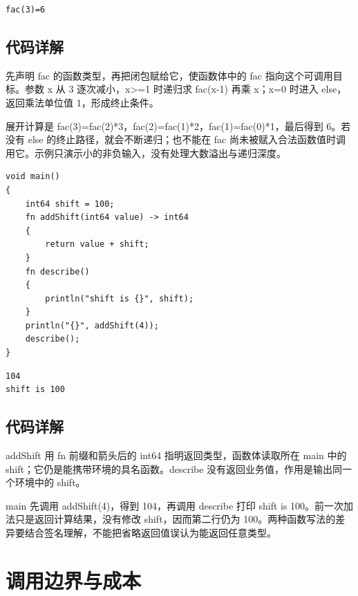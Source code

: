 \par
\medskip
\begin{lstlisting}[style=out]
fac(3)=6
\end{lstlisting}
\par
\medskip

\subsection*{代码详解}

先声明 fac 的函数类型，再把闭包赋给它，使函数体中的 fac 指向这个可调用目标。参数 x 从 3 逐次减小，x>=1 时递归求 fac(x-1) 再乘 x；x=0 时进入 else，返回乘法单位值 1，形成终止条件。

展开计算是 fac(3)=fac(2)*3，fac(2)=fac(1)*2，fac(1)=fac(0)*1，最后得到 6。若没有 else 的终止路径，就会不断递归；也不能在 fac 尚未被赋入合法函数值时调用它。示例只演示小的非负输入，没有处理大数溢出与递归深度。

\par
\medskip
\begin{lstlisting}[style=chali]
void main()
{
    int64 shift = 100;
    fn addShift(int64 value) -> int64
    {
        return value + shift;
    }
    fn describe()
    {
        println("shift is {}", shift);
    }
    println("{}", addShift(4));
    describe();
}
\end{lstlisting}
\par
\medskip

\par
\medskip
\begin{lstlisting}[style=out]
104
shift is 100
\end{lstlisting}
\par
\medskip

\subsection*{代码详解}

addShift 用 fn 前缀和箭头后的 int64 指明返回类型，函数体读取所在 main 中的 shift；它仍是能携带环境的具名函数。describe 没有返回业务值，作用是输出同一个环境中的 shift。

main 先调用 addShift(4)，得到 104，再调用 describe 打印 shift is 100。前一次加法只是返回计算结果，没有修改 shift，因而第二行仍为 100。两种函数写法的差异要结合签名理解，不能把省略返回值误认为能返回任意类型。

\section{调用边界与成本}

